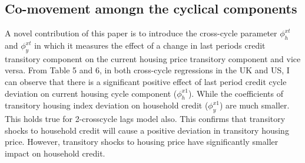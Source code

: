 \documentclass[12pt]{article}
\begin{document}
\begin{outline}[enumerate]
		
		\subsection{Co-movement amongn the cyclical components}
		A novel contribution of this paper is to introduce the cross-cycle parameter $\phi^{xt}_h$ and $\phi^{xt}_{y}$ in which it measures the effect of a change in last periods credit transitory component on the current housing price transitory component and vice versa. From Table 5 and 6, in both cross-cycle regressions in the UK and US, I can observe that there is a significant positive effect of last period credit cycle deviation on current housing cycle component ($\phi^{x1}_{h}$). While the coefficients of transitory housing index deviation on household credit ($\phi^{x1}_{y}$) are much smaller. This holds true for 2-crosscycle lags model also. This confirms that transitory shocks to household credit will cause a positive deviation in transitory housing price. However, transitory shocks to housing price have significantly smaller impact on household credit.
		

		
		
		
%		
		\pagebreak

\end{outline}
\end{document}
